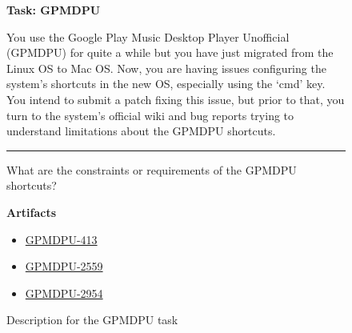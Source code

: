 \begin{figure}
\begin{mdframed}[backgroundcolor=gray!04] 
\begin{scriptsize}

{\large \textbf{Task: GPMDPU}} \bigskip


You use the Google Play Music Desktop Player Unofficial (GPMDPU) for quite a while but you
have just migrated from the Linux OS to Mac OS. Now, you are having issues configuring the
system's shortcuts in the new OS, especially using the `cmd' key. You intend to submit a patch
fixing this issue, but prior to that, you turn to the system's official wiki and bug reports trying to
understand limitations about the GPMDPU shortcuts.


\begin{center}
\rule{10cm}{0.4pt}
\end{center}

What are the constraints or requirements of the GPMDPU shortcuts?

\medskip

\textbf{Artifacts}

\begin{itemize}
    \item \href{https://github.com/MarshallOfSound/Google-Play-Music-Desktop-Player-UNOFFICIAL-/issues/413}{GPMDPU-413}
    \item \href{https://github.com/MarshallOfSound/Google-Play-Music-Desktop-Player-UNOFFICIAL-/issues/2559}{GPMDPU-2559}
    \item \href{https://github.com/MarshallOfSound/Google-Play-Music-Desktop-Player-UNOFFICIAL-/issues/2954}{GPMDPU-2954}
\end{itemize}

\end{scriptsize}
\end{mdframed}
\caption{Description for the GPMDPU task}
\end{figure}

    
